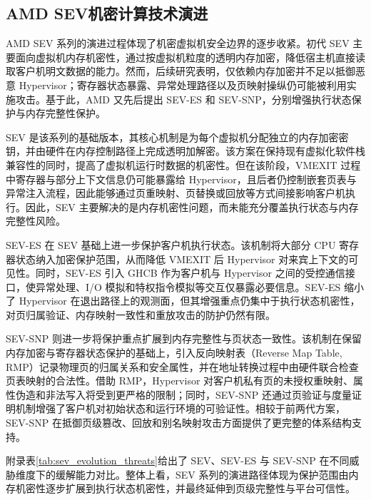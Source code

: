 \subsection{AMD SEV机密计算技术演进}

AMD SEV 系列的演进过程体现了机密虚拟机安全边界的逐步收紧。初代 SEV 主要面向虚拟机内存机密性，通过按虚拟机粒度的透明内存加密，降低宿主机直接读取客户机明文数据的能力\cite{kaplan2016amd,amd64manual}。然而，后续研究表明，仅依赖内存加密并不足以抵御恶意 Hypervisor；寄存器状态暴露、异常处理路径以及页映射操纵仍可能被利用实施攻击\cite{morbitzer2018severed}。基于此，AMD 又先后提出 SEV-ES 和 SEV-SNP，分别增强执行状态保护与内存完整性保护。

SEV 是该系列的基础版本，其核心机制是为每个虚拟机分配独立的内存加密密钥，并由硬件在内存控制路径上完成透明加解密\cite{kaplan2016amd,amd64manual}。该方案在保持现有虚拟化软件栈兼容性的同时，提高了虚拟机运行时数据的机密性。但在该阶段，VMEXIT 过程中寄存器与部分上下文信息仍可能暴露给 Hypervisor，且后者仍控制嵌套页表与异常注入流程，因此能够通过页重映射、页替换或回放等方式间接影响客户机执行\cite{morbitzer2018severed}。因此，SEV 主要解决的是内存机密性问题，而未能充分覆盖执行状态与内存完整性风险。

SEV-ES 在 SEV 基础上进一步保护客户机执行状态。该机制将大部分 CPU 寄存器状态纳入加密保护范围，从而降低 VMEXIT 后 Hypervisor 对来宾上下文的可见性\cite{amd_sev_es_whitepaper,amd64manual}。同时，SEV-ES 引入 GHCB 作为客户机与 Hypervisor 之间的受控通信接口，使异常处理、I/O 模拟和特权指令模拟等交互仅暴露必要信息\cite{amd_sev_es_whitepaper}。SEV-ES 缩小了 Hypervisor 在退出路径上的观测面，但其增强重点仍集中于执行状态机密性，对页归属验证、内存映射一致性和重放攻击的防护仍然有限。

SEV-SNP 则进一步将保护重点扩展到内存完整性与页状态一致性。该机制在保留内存加密与寄存器状态保护的基础上，引入反向映射表（Reverse Map Table, RMP）记录物理页的归属关系和安全属性，并在地址转换过程中由硬件联合检查页表映射的合法性\cite{amd_sev_snp_whitepaper,amd64manual}。借助 RMP，Hypervisor 对客户机私有页的未授权重映射、属性伪造和非法写入将受到更严格的限制；同时，SEV-SNP 还通过页验证与度量证明机制增强了客户机对初始状态和运行环境的可验证性\cite{amd_sev_snp_whitepaper}。相较于前两代方案，SEV-SNP 在抵御页级篡改、回放和别名映射攻击方面提供了更完整的体系结构支持。

附录表\ref{tab:sev_evolution_threats}给出了 SEV、SEV-ES 与 SEV-SNP 在不同威胁维度下的缓解能力对比。整体上看，SEV 系列的演进路径体现为保护范围由内存机密性逐步扩展到执行状态机密性，并最终延伸到页级完整性与平台可信性。

